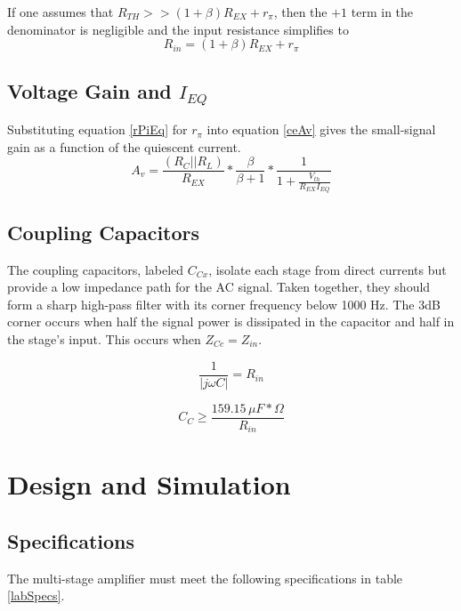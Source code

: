 \documentclass[titlepage, letterpaper, 11pt]{article}
\begin{document}
If one assumes that $R_{TH}>>(1+\beta)R_{EX}+r_{\pi}$, then the
$+1$ term in the denominator is negligible and the input resistance
simplifies to
\begin{equation}
R_{in}=(1+\beta)R_{EX}+r_{\pi}
\end{equation}

\subsection{Voltage Gain and $I_{EQ}$}
\label{gainVSquiescentCurrent}

Substituting equation \ref{rPiEq} for $r_{\pi}$ into equation 
\ref{ceAv} gives the small-signal gain as a function of the quiescent
current.
\begin{equation}
A_{v}=\frac{(R_{C}||R_{L})}{R_{EX}}*\frac{\beta}{\beta+1}*
\frac{1}{1+\frac{V_{th}}{R_{EX}I_{EQ}}}
\end{equation}

\subsection{Coupling Capacitors}

The coupling capacitors, labeled $C_{Cx}$, isolate each stage from
direct currents but provide a low impedance path for the AC signal.
Taken together, they should form a sharp high-pass filter with its
corner frequency below 1000 Hz. The 3dB corner occurs when half the
signal power is dissipated in the capacitor and half in the stage's
input. This occurs when $Z_{Cc}=Z_{in}$.

\begin{equation*}
\frac{1}{|j\omega C|}=R_{in}
\end{equation*}

\begin{equation}
C_{C}\geq \frac{159.15\,\mu F*\Omega}{R_{in}}
\label{couplingCapacitors}
\end{equation}

\section{Design and Simulation}

\subsection{Specifications}

The multi-stage amplifier must meet the following specifications in
table \ref{labSpecs}.
\end{document}
